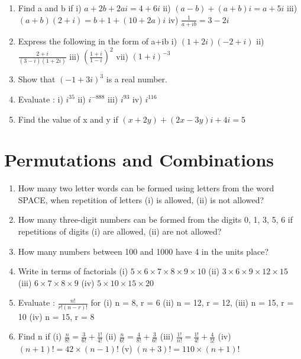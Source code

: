 \documentclass[14pt]{article}
\begin{document}
\begin{multicols}{2}
\begin{enumerate}[resume]
\item Find a and b if i) $a + 2b + 2ai = 4 + 6i$ 
ii) $(a-b) + (a+b)i = a + 5i$
iii) $(a+b) (2 + i) = b + 1 + (10 + 2a)i$
iv) $\frac{1}{a+ib}=3-2i$

\item Express the following in the form of a+ib
i) $(1+2i)(-2+i)$ ii) $\frac{2+i}{(3-i)(1+2i)} $
iii) $\left( \frac{1+i}{1-i} \right)^2$ vii) $(1+i)^{-3}$

\item Show that $(-1+3i)^3$ is a real number.

\item Evaluate : i) $i^{35}$ ii) $i^{-888}$ iii) $i^{93}$ iv) $i^{116}$

\item Find the value of x and y if  $(x+2y) + (2x-3y) i + 4i = 5$

\end{enumerate} 








\section{Permutations and Combinations}
\noindent
\begin{enumerate}[resume]
  
\item How many two letter words can be formed
using letters from the word SPACE, when
repetition of letters (i) is allowed, (ii) is not
allowed?
\item How many three-digit numbers can be
formed from the digits 0, 1, 3, 5, 6 if
repetitions of digits (i) are allowed, (ii) are
not allowed?
\item How many numbers between 100 and 1000
have 4 in the units place?
		 
\item Write in terms of factorials
(i)	$5 \times 6 \times 7 \times 8 \times 9 \times 10	$
(ii)	$3 \times 6 \times 9 \times 12 \times 15$
(iii)	$6 \times 7 \times 8 \times 9$
(iv)  $5 \times 10 \times 15 \times 20$

\item 
Evaluate : $\frac{n!}{r!(n-r)!}$ for  (i)	 n = 8, r = 6	 (ii)	 n = 12, r = 12,
	 (iii)	 n = 15, r = 10	 (iv)	 n = 15, r = 8
	 
\item Find n if
(i) $\frac{n}{8!}= \frac{3}{6!}+\frac{1!}{4!}$
(ii) $\frac{n}{6!}= \frac{4}{8!}+\frac{3}{6!}$
(iii) $\frac{1!}{n!}= \frac{1!}{4!}+\frac{4}{5!}$
(iv) $(n+1)!=42 \times (n-1)!$
(v) $(n+3)!=110 \times (n+1)!$


\end{enumerate}
\end{multicols}
\end{document}
